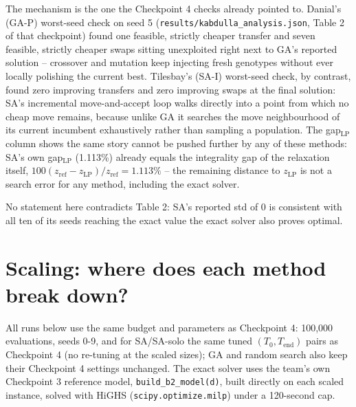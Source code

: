 \documentclass[11pt,a4paper]{article}
\newcommand{\zref}{z_{\mathrm{ref}}}
\newcommand{\zLP}{z_{\mathrm{LP}}}
\begin{document}
The mechanism is the one the Checkpoint 4 checks already pointed to. Danial's (GA-P) worst-seed check on seed 5 (\texttt{results/kabdulla\_analysis.json}, Table 2 of that checkpoint) found one feasible, strictly cheaper transfer and seven feasible, strictly cheaper swaps sitting unexploited right next to GA's reported solution -- crossover and mutation keep injecting fresh genotypes without ever locally polishing the current best. Tilesbay's (SA-I) worst-seed check, by contrast, found zero improving transfers and zero improving swaps at the final solution: SA's incremental move-and-accept loop walks directly into a point from which no cheap move remains, because unlike GA it searches the move neighbourhood of its current incumbent exhaustively rather than sampling a population. The gap$_{\mathrm{LP}}$ column shows the same story cannot be pushed further by any of these methods: SA's own gap$_{\mathrm{LP}}$ (1.113\%) already equals the integrality gap of the relaxation itself, $100(\zref-\zLP)/\zref=1.113\%$ -- the remaining distance to $\zLP$ is not a search error for any method, including the exact solver.

No statement here contradicts Table 2: SA's reported std of 0 is consistent with all ten of its seeds reaching the exact value the exact solver also proves optimal.

\section{Scaling: where does each method break down?}

All runs below use the same budget and parameters as Checkpoint 4: 100{,}000 evaluations, seeds 0-9, and for SA/SA-solo the same tuned $(T_0,T_{\mathrm{end}})$ pairs as Checkpoint 4 (no re-tuning at the scaled sizes); GA and random search also keep their Checkpoint 4 settings unchanged. The exact solver uses the team's own Checkpoint 3 reference model, \texttt{build\_b2\_model(d)}, built directly on each scaled instance, solved with HiGHS (\texttt{scipy.optimize.milp}) under a 120-second cap.
\end{document}
